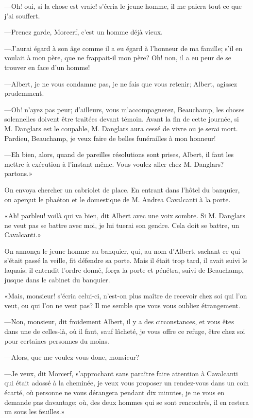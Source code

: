 —Oh! oui, si la chose est vraie! s'écria le jeune homme, il me paiera tout ce que j'ai souffert. 

—Prenez garde, Morcerf, c'est un homme déjà vieux. 

—J'aurai égard à son âge comme il a eu égard à l'honneur de ma famille; s'il en voulait à mon père, que ne frappait-il mon père? Oh! non, il a eu peur de se trouver en face d'un homme! 

—Albert, je ne vous condamne pas, je ne fais que vous retenir; Albert, agissez prudemment. 

—Oh! n'ayez pas peur; d'ailleurs, vous m'accompagnerez, Beauchamp, les choses solennelles doivent être traitées devant témoin. Avant la fin de cette journée, si M. Danglars est le coupable, M. Danglars aura cessé de vivre ou je serai mort. Pardieu, Beauchamp, je veux faire de belles funérailles à mon honneur! 

—Eh bien, alors, quand de pareilles résolutions sont prises, Albert, il faut les mettre à exécution à l'instant même. Vous voulez aller chez M. Danglars? partons.» 

On envoya chercher un cabriolet de place. En entrant dans l'hôtel du banquier, on aperçut le phaéton et le domestique de M. Andrea Cavalcanti à la porte. 

«Ah! parbleu! voilà qui va bien, dit Albert avec une voix sombre. Si M. Danglars ne veut pas se battre avec moi, je lui tuerai son gendre. Cela doit se battre, un Cavalcanti.» 

On annonça le jeune homme au banquier, qui, au nom d'Albert, sachant ce qui s'était passé la veille, fit défendre sa porte. Mais il était trop tard, il avait suivi le laquais; il entendit l'ordre donné, força la porte et pénétra, suivi de Beauchamp, jusque dans le cabinet du banquier. 

«Mais, monsieur! s'écria celui-ci, n'est-on plus maître de recevoir chez soi qui l'on veut, ou qui l'on ne veut pas? Il me semble que vous vous oubliez étrangement. 

—Non, monsieur, dit froidement Albert, il y a des circonstances, et vous êtes dans une de celles-là, où il faut, sauf lâcheté, je vous offre ce refuge, être chez soi pour certaines personnes du moins. 

—Alors, que me voulez-vous donc, monsieur? 

—Je veux, dit Morcerf, s'approchant sans paraître faire attention à Cavalcanti qui était adossé à la cheminée, je veux vous proposer un rendez-vous dans un coin écarté, où personne ne vous dérangera pendant dix minutes, je ne vous en demande pas davantage; où, des deux hommes qui se sont rencontrés, il en restera un sous les feuilles.» 

